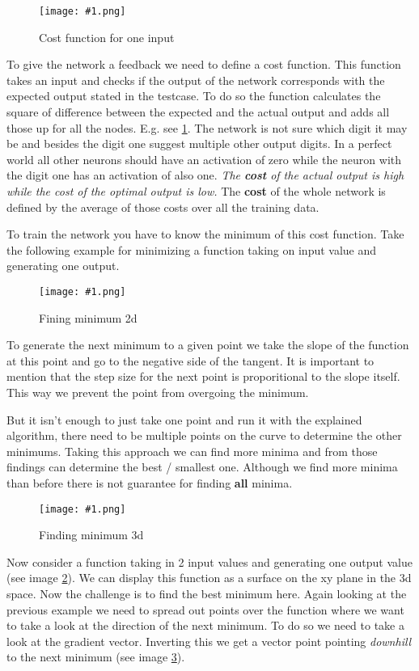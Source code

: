 \documentclass{article}
\newcommand{\lbl}[1]{(see image \ref{#1})}
\newcommand{\img}[1]{
	\centering
	\texttt{[image: \#1.png]}
	\label{#1}
}
\begin{document}
\begin{figure}[!htbp]
\img{ai_13}
\caption{Cost function for one input}
\end{figure}

To give the network a feedback we need to define a cost function. This function takes an input and checks if the output of the network corresponds with the expected output stated in the testcase. To do so the function calculates the square of difference between the expected and the actual output and adds all those up for all the nodes. E.g. see \ref{ai_13}. The network is not sure which digit it may be and besides the digit one suggest multiple other output digits. In a perfect world all other neurons should have an activation of zero while the neuron with the digit one has an activation of also one. \textit{The \textbf{cost} of the actual output is high while the cost of the optimal output is low.} The \textbf{cost} of the whole network is defined by the average of those costs over all the training data.


To train the network you have to know the minimum of this cost function. Take the following example for minimizing a function taking on input value and generating one output. 

\begin{figure}[!htbp]
\img{ai_14}
\caption{Fining minimum 2d}
\end{figure}

To generate the next minimum to a given point we take the slope of the function at this point and go to the negative side of the tangent. It is important to mention that the step size for the next point is proporitional to the slope itself. This way we prevent the point from overgoing the minimum. 

But it isn't enough to just take one point and run it with the explained algorithm, there need to be multiple points on the curve to determine the other minimums. Taking this approach we can find more minima and from those findings can determine the best / smallest one. Although we find more minima than before there is not guarantee for finding \textbf{all} minima.

\begin{figure}[!htbp]
\img{ai_16}
\caption{Finding minimum 3d}
\end{figure}

Now consider a function taking in 2 input values and generating one output value \lbl{ai_14}. We can display this function as a surface on the xy plane in the 3d space. Now the challenge is to find the best minimum here. Again looking at the previous example we need to spread out points over the function where we want to take a look at the direction of the next minimum. To do so we need to take a look at the gradient vector. Inverting this we get a vector point pointing \textit{downhill} to the next minimum \lbl{ai_16}. 
\end{document}
